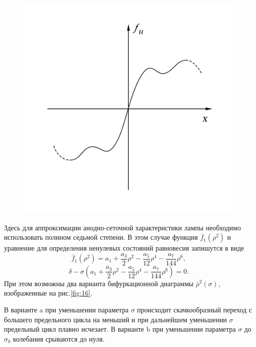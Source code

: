 \begin{figure}
    \includegraphics[width=\linewidth]{photo/pics/Ris11.png} 
    \caption{}
    \label{fig:13}
\end{figure} 

Здесь для аппроксимации анодно-сеточной характеристики лампы необходимо использовать полином седьмой степени. 
В этом случае функция $\bar{f}_1(\rho^2)$ и уравнение для определения ненулевых состояний равновесия запишутся 
в виде $$\bar{f}_1(\rho^2)=a_1+\frac{a_3}{2}\rho^2-\frac{a_5}{12}\rho^4-\frac{a_7}{144}\rho^6,$$ $$\delta-\sigma(a_1+\frac{a_3}{2}\rho^2-\frac{a_5}{12}\rho^4-\frac{a_7}{144}\rho^6)=0.$$
При этом возможны два варианта бифуркационной диаграммы $\bar \rho^2(\sigma)$, изображенные на рис.\ref{fig:16}. 

В варианте a при уменьшении параметра $\sigma$ происходит скачкообразный переход с большего предельного цикла на меньший
 и при дальнейшем уменьшении $\sigma$ предельный цикл плавно исчезает. В варианте b при уменьшении параметра $\sigma$ до $\sigma_0$ колебания срываются до нуля. 

